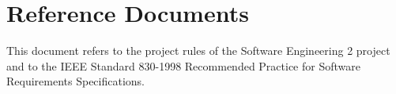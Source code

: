 \section{Reference Documents}
This document refers to the project rules of the Software Engineering 2
project and to the IEEE Standard 830-1998 Recommended Practice for Software Requirements Specifications.
